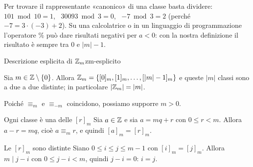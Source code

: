 \begin{spiegazione}
    Per trovare il rappresentante «canonico» di una classe basta dividere: $101 \bmod 10 = 1$, \ $30093 \bmod 3 = 0$,
    \ $-7 \bmod 3 = 2$ (perché $-7 = 3 \cdot (-3) + 2$). Su una calcolatrice o in un linguaggio di programmazione l'operatore $\%$ può
    dare risultati negativi per $a < 0$: con la nostra definizione il risultato è sempre tra $0$ e $|m| - 1$.
\end{spiegazione}

\begin{concetto}
\begin{Teorema}{Descrizione esplicita di $\mathbb{Z}_m$}{zm-esplicito}
    \begin{prerequisiti}
    \end{prerequisiti}
    Sia $m \in \mathbb{Z} \setminus \{0\}$. Allora $\mathbb{Z}_m = \{[0]_m, [1]_m, \dots, [|m| - 1]_m\}$ e queste $|m|$ classi sono a due a due distinte; in particolare
    $|\mathbb{Z}_m| = |m|$.
\end{Teorema}
\begin{dimostrazione}
    Poiché $\equiv_m$ e $\equiv_{-m}$ coincidono, possiamo supporre $m > 0$.
    \begin{caso}{Ogni classe è una delle $[r]_m$}
        Sia $a \in \mathbb{Z}$ e sia $a = mq + r$ con $0 \leq r < m$. Allora $a - r = mq$, cioè $a \equiv_m r$, e quindi $[a]_m = [r]_m$.
    \end{caso}
    \begin{caso}{Le $[r]_m$ sono distinte}
        Siano $0 \leq i \leq j \leq m - 1$ con $[i]_m = [j]_m$. Allora $m \mid j - i$ con $0 \leq j - i < m$, quindi $j - i = 0$: $i = j$.
    \end{caso}
\end{dimostrazione}
\end{concetto}

